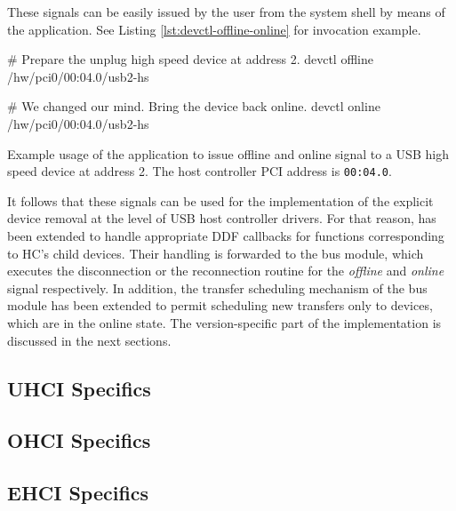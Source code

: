 These signals can be easily issued by the user from the system shell by means
of the  application. See Listing \ref{lst:devctl-offline-online}
for invocation example.

\begin{listing}[H]
	\begin{bdsh}
		# Prepare the unplug high speed device at address 2.
		devctl offline /hw/pci0/00:04.0/usb2-hs

		# We changed our mind. Bring the device back online.
		devctl online /hw/pci0/00:04.0/usb2-hs
	\end{bdsh}
	\caption[Example usage of  to issue offline and online
	signal.]{Example usage of the  application to issue offline and
	online signal to a USB high speed device at address 2. The host controller
	PCI address is \texttt{00:04.0}.}
	\label{lst:devctl-offline-online}
\end{listing}

It follows that these signals can be used for the implementation of the
explicit device removal at the level of USB host controller drivers. For that
reason,  has been extended to handle appropriate DDF callbacks
for functions corresponding to HC's child devices. Their handling is forwarded
to the bus module, which executes the disconnection or the reconnection routine
for the \textit{offline} and \textit{online} signal respectively. In addition,
the transfer scheduling mechanism of the bus module has been extended to permit
scheduling new transfers only to devices, which are in the online state. The
version-specific part of the implementation is discussed in the next sections.


\subsection{UHCI Specifics}



\subsection{OHCI Specifics}



\subsection{EHCI Specifics}



